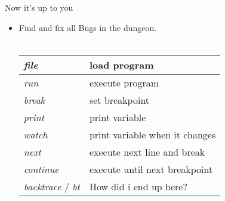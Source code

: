 \begin{frame}{Now it's up to you}
	\begin{itemize}
		\item Find and fix all Bugs in the dungeon.\\\ \\
		\begin{tabular}{|l|l|}
			\hline
			\textit{file} & load program\\\hline
			\textit{run} & execute program\\\hline
			\textit{break} & set breakpoint\\\hline
			\textit{print} & print variable\\\hline
			\textit{watch} & print variable when it changes\\\hline
			\textit{next} & execute next line and break\\\hline
			\textit{continue} & execute until next breakpoint\\\hline
			\textit{backtrace} / \textit{bt} & How did i end up here?\\\hline
		\end{tabular}
	\end{itemize}
\end{frame}

